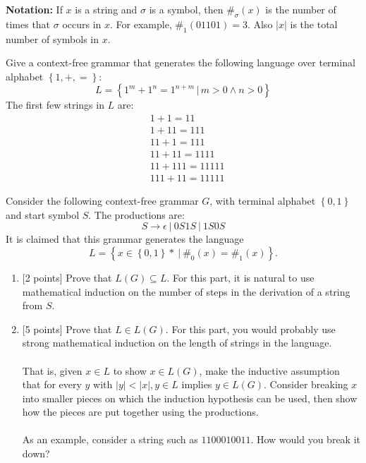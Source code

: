 \documentclass[12pt,letterpaper,boxed,cm]{hmcpset}
\newcommand{\abs}[1]{\left| #1 \right|}
\newcommand{\set}[1]{\left\{ #1 \right\}}
\newcommand{\tb}[1]{\textbf{#1}}
\begin{document}
\noindent
\tb{Notation:} If $x$ is a string and $\sigma$ is a symbol, then $\#_\sigma(x)$ is the number of times that $\sigma$ occurs in $x$. For example, $\#_1(01101) = 3$. Also $\abs{x}$ is the total number of symbols in $x$.


\begin{problem}[1.]
    [3 points] Give a context-free grammar that generates the following language over terminal alphabet $\set{1, +, =}$:
    \[
            L = \set{1^m+1^n=1^{n+m}\,|\,m > 0 \land n > 0}
    \]
    The first few strings in $L$ are:
    \begin{align*}
        &1+1=11 \\
        &1+11=111 \\
        &11+1=111 \\
        &11+11=1111 \\
        &11+111=11111 \\
        &111+11=11111 
    \end{align*}
\end{problem}

\begin{solution}
    \vfill
\end{solution}
\newpage

\begin{problem}[2.]
    [7 points] Consider the following context-free grammar $G$, with terminal alphabet $\set{0, 1}$ and start symbol $S$. The productions are:
    \[
        S\rightarrow \epsilon~|~0S1S~|~1S0S
    \]
    It is claimed that this grammar generates the language 
    \[
        L = \set{x \in \set{0, 1}*~|~\#_0(x) = \#_1(x)}.
    \]
    \begin{enumerate}[label=\alph*.]
        \item {[2 points]} Prove that $L(G) \subseteq L$. For this part, it is natural to use mathematical induction on the number of steps in the derivation of a string from $S$.
        \item {[5 points]} Prove that $L \in L(G)$. For this part, you would probably use strong mathematical induction on the length of strings in the language.\\\\
        That is, given $x \in L$ to show $x \in L(G)$, make the inductive assumption that for every $y$ with $\abs{y} < \abs{x}, y \in L$ implies $y \in L(G)$. Consider breaking $x$ into smaller pieces on which the induction hypothesis can be used, then show how the pieces are put together using the productions.\\\\
        As an example, consider a string such as $1100010011$. How would you break it down?
    \end{enumerate}
\end{problem}
\end{document}
